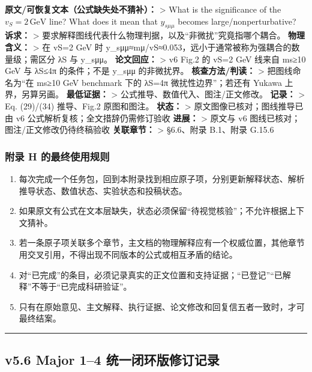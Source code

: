 \documentclass[
]{article}
\providecommand{\tightlist}{%
  \setlength{\itemsep}{0pt}\setlength{\parskip}{0pt}}
\begin{document}
\textbf{原文/可恢复文本（公式缺失处不猜补）：} \textgreater{} What is
the significance of the \(v_S=2\,\mathrm{GeV}\) line? What does it mean
that \(y_{s\mu\mu}\) becomes large/nonperturbative? \textbf{诉求：}
\textgreater{}
要求解释图线代表什么物理判据，以及``非微扰''究竟指哪个耦合。
\textbf{物理含义：} \textgreater{} 在 vS=2 GeV 时
y\_sμμ≈mμ/vS≈0.053，远小于通常被称为强耦合的数量级；需区分 λS 与
y\_sμμ。 \textbf{论文回应：} \textgreater{} v6 Fig.2 的 vS=2 GeV 线来自
ms≥10 GeV 与 λS≤4π 的条件；不是 y\_sμμ 的非微扰界。
\textbf{核查方法/判读：} \textgreater{} 把图线命名为``在 ms≥10 GeV
benchmark 下的 λS=4π 微扰性边界''；若还有 Yukawa 上界，另算另画。
\textbf{最低证据：} \textgreater{} 公式推导、数值代入、图注/正文修改。
\textbf{记录：} \textgreater{} Eq. (29)/(34) 推导、Fig.2 原图和图注。
\textbf{状态：} \textgreater{} 原文图像已核对；图线推导已由 v6
公式解析复核；全文措辞仍需修订验收 \textbf{进展：} \textgreater{} 原文与
v6 图线已核对；图注/正文修改仍待终稿验收 \textbf{关联章节：}
\textgreater{} §6.6、附录 B.1、附录 G.15.6

\subsubsection{附录 H
的最终使用规则}\label{ux9644ux5f55-h-ux7684ux6700ux7ec8ux4f7fux7528ux89c4ux5219}

\begin{enumerate}
\def\labelenumi{\arabic{enumi}.}
\tightlist
\item
  每次完成一个任务包，回到本附录找到相应原子项，分别更新解释状态、解析推导状态、数值状态、实验状态和投稿状态。
\item
  如果原文有公式在文本层缺失，状态必须保留``待视觉核验''；不允许根据上下文猜补。
\item
  若一条原子项关联多个章节，主文档的物理解释应有一个权威位置，其他章节用交叉引用，不得出现不同版本的公式或相互矛盾的结论。
\item
  对``已完成''的条目，必须记录真实的正文位置和支持证据；``已登记''``已解释''不等于``已完成科研验证''。
\item
  只有在原始意见、主文解释、执行证据、论文修改和回复信五者一致时，才可最终结案。
\end{enumerate}

\begin{center}\rule{0.5\linewidth}{0.5pt}\end{center}

\subsection{v5.6 Major 1--4
统一闭环版修订记录}\label{v5.6-major-14-ux7edfux4e00ux95edux73afux7248ux4feeux8ba2ux8bb0ux5f55}
\end{document}
